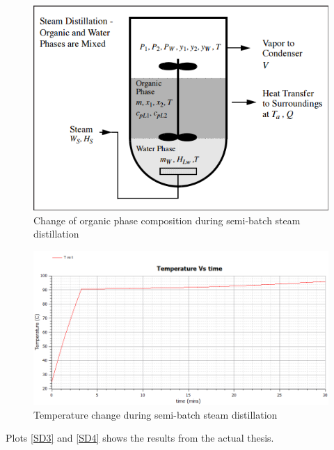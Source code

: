 \documentclass[12pt]{report}
\begin{document}
\begin{figure}
\centering
\includegraphics[width=0.9\linewidth]{SD}
\caption{Change of organic phase composition during semi-batch steam distillation}
\label{SD1}
\end{figure}

\begin{figure}
\centering
\includegraphics[width=0.9\linewidth]{SD2}
\caption{Temperature change during semi-batch steam distillation}
\label{SD2}
\end{figure}

Plots \ref{SD3} and \ref{SD4} shows the results from the actual thesis.
\end{document}
